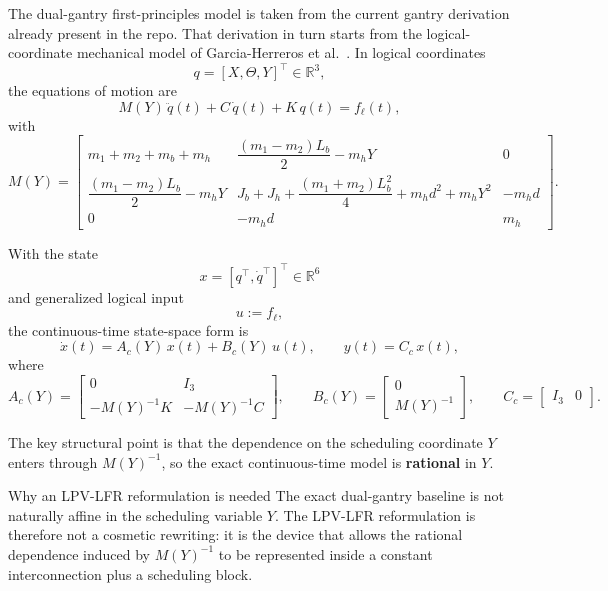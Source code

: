﻿\documentclass[11pt]{article}
\newcommand{\R}{\mathbb{R}}
\begin{document}
The dual-gantry first-principles model is taken from the current gantry
derivation already present in the repo. That derivation in turn starts from the
logical-coordinate mechanical model of Garcia-Herreros et al.~\cite{garcia2013model}. In logical
coordinates
\[
q = [X,\Theta,Y]^\top \in \R^3,
\]
the equations of motion are
\begin{equation}
    M(Y)\,\ddot{q}(t) + C\,\dot{q}(t) + K\,q(t) = f_\ell(t),
    \label{eqv:eom}
\end{equation}
with
\begin{equation}
    M(Y) =
    \begin{bmatrix}
        m_1 + m_2 + m_b + m_h &
        \dfrac{(m_1-m_2)L_b}{2} - m_h Y &
        0 \\
        \dfrac{(m_1-m_2)L_b}{2} - m_h Y &
        J_b + J_h + \dfrac{(m_1+m_2)L_b^2}{4} + m_h d^2 + m_h Y^2 &
        -m_h d \\
        0 & -m_h d & m_h
    \end{bmatrix}.
    \label{eqv:M}
\end{equation}

With the state
\[
x = [q^\top,\dot{q}^\top]^\top \in \R^6
\]
and generalized logical input
\[
u := f_\ell,
\]
the continuous-time state-space form is
\begin{equation}
    \dot{x}(t) = A_c(Y)\,x(t) + B_c(Y)\,u(t),
    \qquad
    y(t) = C_c\,x(t),
    \label{eqv:ctss}
\end{equation}
where
\begin{equation}
    A_c(Y) =
    \begin{bmatrix}
        0 & I_3 \\
        -M(Y)^{-1}K & -M(Y)^{-1}C
    \end{bmatrix},
    \qquad
    B_c(Y) =
    \begin{bmatrix}
        0 \\
        M(Y)^{-1}
    \end{bmatrix},
    \qquad
    C_c = \begin{bmatrix} I_3 & 0 \end{bmatrix}.
    \label{eqv:ctmats}
\end{equation}

The key structural point is that the dependence on the scheduling coordinate
$Y$ enters through $M(Y)^{-1}$, so the exact continuous-time model is
\textbf{rational} in $Y$.

\begin{resultbox}{Why an LPV-LFR reformulation is needed}
The exact dual-gantry baseline is not naturally affine in the scheduling
variable $Y$. The LPV-LFR reformulation is therefore not a cosmetic rewriting:
it is the device that allows the rational dependence induced by
$M(Y)^{-1}$ to be represented inside a constant interconnection plus a
scheduling block.
\end{resultbox}
\end{document}
